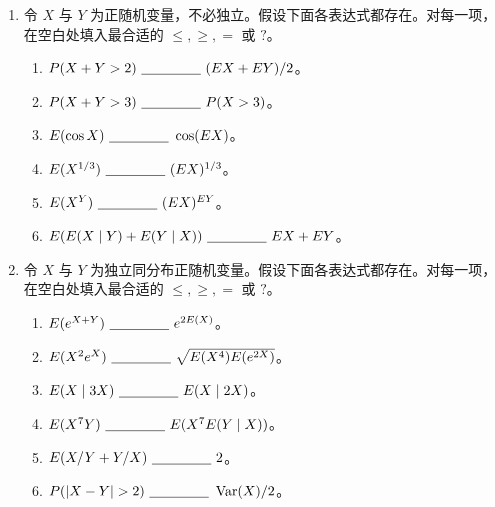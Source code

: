 \documentclass[UTF8, 12pt, fontset=fandol, oneside]{ctexart}
\begin{document}
\begin{enumerate}
  \item 令 $X$ 与 $Y$ 为正随机变量，不必独立。假设下面各表达式都存在。对每一项，在空白处填入最合适的 $\le,\ge,=$ 或 $?$。
  \begin{enumerate}
    \item $P(X+Y>2)\ \underline{\hspace{1.5cm}}\ (EX+EY)/2$。
    \item $P(X+Y>3)\ \underline{\hspace{1.5cm}}\ P(X>3)$。
    \item $E(\cos X)\ \underline{\hspace{1.5cm}}\ \cos(EX)$。
    \item $E(X^{1/3})\ \underline{\hspace{1.5cm}}\ (EX)^{1/3}$。
    \item $E(X^Y)\ \underline{\hspace{1.5cm}}\ (EX)^{EY}$。
    \item $E(E(X\mid Y)+E(Y\mid X))\ \underline{\hspace{1.5cm}}\ EX+EY$。
  \end{enumerate}

  \item 令 $X$ 与 $Y$ 为独立同分布正随机变量。假设下面各表达式都存在。对每一项，在空白处填入最合适的 $\le,\ge,=$ 或 $?$。
  \begin{enumerate}
    \item $E(e^{X+Y})\ \underline{\hspace{1.5cm}}\ e^{2E(X)}$。
    \item $E(X^2e^X)\ \underline{\hspace{1.5cm}}\ \sqrt{E(X^4)E(e^{2X})}$。
    \item $E(X\mid 3X)\ \underline{\hspace{1.5cm}}\ E(X\mid 2X)$。
    \item $E(X^7Y)\ \underline{\hspace{1.5cm}}\ E(X^7E(Y\mid X))$。
    \item $E(X/Y+Y/X)\ \underline{\hspace{1.5cm}}\ 2$。
    \item $P(|X-Y|>2)\ \underline{\hspace{1.5cm}}\ \operatorname{Var}(X)/2$。
  \end{enumerate}


\end{enumerate}
\end{document}
